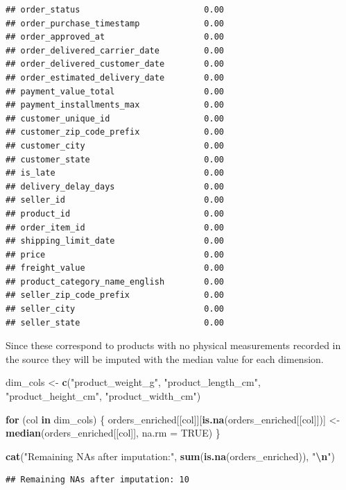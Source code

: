 \documentclass[
]{article}
\newenvironment{Shaded}{\begin{snugshade}}{\end{snugshade}}
\newcommand{\AttributeTok}[1]{\textcolor[rgb]{0.13,0.29,0.53}{#1}}
\newcommand{\ConstantTok}[1]{\textcolor[rgb]{0.56,0.35,0.01}{#1}}
\newcommand{\ControlFlowTok}[1]{\textcolor[rgb]{0.13,0.29,0.53}{\textbf{#1}}}
\newcommand{\FunctionTok}[1]{\textcolor[rgb]{0.13,0.29,0.53}{\textbf{#1}}}
\newcommand{\NormalTok}[1]{#1}
\newcommand{\OtherTok}[1]{\textcolor[rgb]{0.56,0.35,0.01}{#1}}
\newcommand{\SpecialCharTok}[1]{\textcolor[rgb]{0.81,0.36,0.00}{\textbf{#1}}}
\newcommand{\StringTok}[1]{\textcolor[rgb]{0.31,0.60,0.02}{#1}}
\begin{document}
\begin{verbatim}
## order_status                         0.00
## order_purchase_timestamp             0.00
## order_approved_at                    0.00
## order_delivered_carrier_date         0.00
## order_delivered_customer_date        0.00
## order_estimated_delivery_date        0.00
## payment_value_total                  0.00
## payment_installments_max             0.00
## customer_unique_id                   0.00
## customer_zip_code_prefix             0.00
## customer_city                        0.00
## customer_state                       0.00
## is_late                              0.00
## delivery_delay_days                  0.00
## seller_id                            0.00
## product_id                           0.00
## order_item_id                        0.00
## shipping_limit_date                  0.00
## price                                0.00
## freight_value                        0.00
## product_category_name_english        0.00
## seller_zip_code_prefix               0.00
## seller_city                          0.00
## seller_state                         0.00
\end{verbatim}

Since these correspond to products with no physical measurements
recorded in the source they will be imputed with the median value for
each dimension.

\begin{Shaded}
\begin{Highlighting}[]
\NormalTok{dim\_cols }\OtherTok{\textless{}{-}} \FunctionTok{c}\NormalTok{(}\StringTok{"product\_weight\_g"}\NormalTok{, }\StringTok{"product\_length\_cm"}\NormalTok{,}
              \StringTok{"product\_height\_cm"}\NormalTok{, }\StringTok{"product\_width\_cm"}\NormalTok{)}

\ControlFlowTok{for}\NormalTok{ (col }\ControlFlowTok{in}\NormalTok{ dim\_cols) \{}
\NormalTok{  orders\_enriched[[col]][}\FunctionTok{is.na}\NormalTok{(orders\_enriched[[col]])] }\OtherTok{\textless{}{-}}
    \FunctionTok{median}\NormalTok{(orders\_enriched[[col]], }\AttributeTok{na.rm =} \ConstantTok{TRUE}\NormalTok{)}
\NormalTok{\}}

\FunctionTok{cat}\NormalTok{(}\StringTok{"Remaining NAs after imputation:"}\NormalTok{, }\FunctionTok{sum}\NormalTok{(}\FunctionTok{is.na}\NormalTok{(orders\_enriched)), }\StringTok{"}\SpecialCharTok{\textbackslash{}n}\StringTok{"}\NormalTok{)}
\end{Highlighting}
\end{Shaded}

\begin{verbatim}
## Remaining NAs after imputation: 10
\end{verbatim}
\end{document}
